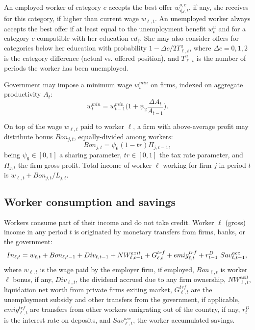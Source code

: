 \documentclass[a4paper,11pt]{article}
\begin{document}
\begin{appendices}
An employed worker of category $c$ accepts the best offer $w_{i|j,t}^{o,c}$, if any, she receives for this category, if higher than current wage $w_{\ell,{t}}$. An unemployed worker always accepts the best offer if at least equal to the unemployment benefit $w_{t}^u$ and for a category $c$ compatible with her education $ed_{\ell}$. She may also consider offers for categories below her education with probability $1 - \Delta c / 2 T_{\ell,t}^u$, where $\Delta c = 0, 1, 2$ is the category difference (actual vs. offered position), and $T_{\ell,t}^u$ is the number of periods the worker has been unemployed.

Government may impose a minimum wage $w_{t}^{min}$ on firms, indexed on aggregate productivity $A_t$:
\begin{equation}
	w_{t}^{min} = w_{t-1}^{min} \biggl( 1 + \psi_2 \frac{ \Delta A_t }{ A_{t-1} }\biggl).
	\label{minimum}
\end{equation}

On top of the wage $w_{\ell,t}$ paid to worker $\ell$, a firm with above-average profit may distribute bonus $Bon_{j,t}$, equally-divided among workers:
\begin{equation}
	Bon_{j,t} = \psi_6 ( 1 - tr ) \Pi_{j,t-1},
\end{equation}
being $\psi_6 \in [0,1]$ a sharing parameter, $tr \in [0,1]$ the tax rate parameter, and $\Pi_{j,t}$ the firm gross profit. Total income of worker $\ell$ working for firm $j$ in period $t$ is $w_{\ell,t} + Bon_{j,t} / L_{j,t}$.


\subsection*{Worker consumption and savings}

Workers consume part of their income and do not take credit. Worker $\ell$ (gross) income in any period $t$ is originated by monetary transfers from firms, banks, or the government:
\begin{equation}
	In_{\ell,t} = w_{\ell,t} + Bon_{\ell,t-1} + Div_{\ell,t-1} + NW_{\ell,t-1}^{exit} + G_{\ell,t}^{trf} + emig_{\ell,t}^{trf} + r_{t-1}^D ~ Sav_{\ell,t-1}^{acc}, \\
\end{equation}
where $w_{\ell,t}$ is the wage paid by the employer firm, if employed, $Bon_{\ell,t}$ is worker $\ell$ bonus, if any, $Div_{\ell,t}$, the dividend accrued due to any firm ownership, $NW_{\ell,t}^{exit}$, liquidation net worth from private firms exiting market, $G_{\ell,t}^{trf}$ are the unemployment subsidy and other transfers from the government, if applicable, $emig_{\ell,t}^{trf}$ are transfers from other workers emigrating out of the country, if any, $r_t^D$ is the interest rate on deposits, and $Sav_{\ell,t}^{acc}$, the worker accumulated savings.


\end{appendices}
\end{document}
